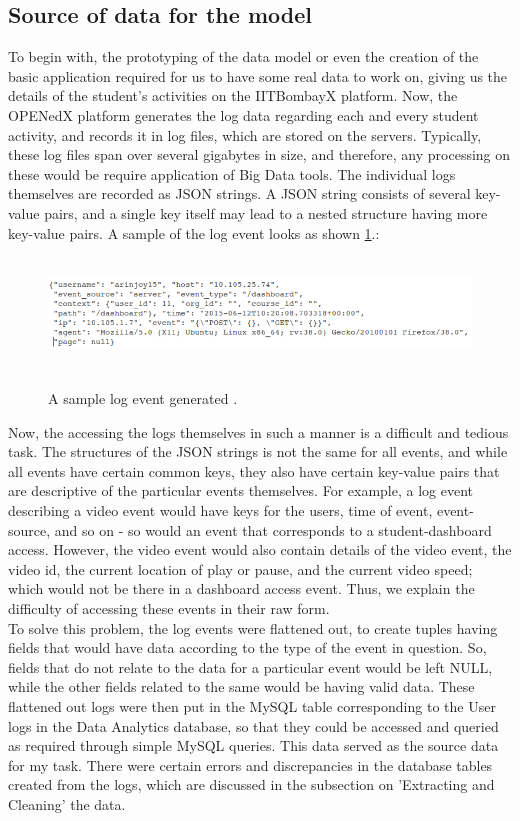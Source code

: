 \documentclass[16pt]{report}
\begin{document}
\subsection{Source of data for the model}

To begin with, the prototyping of the data model or even the creation of the basic application required for us to have some real data to work on, giving us the details of the student's activities on the IITBombayX platform. Now, the OPENedX platform generates the log data regarding each and every student activity, and records it in log files, which are stored on the servers. Typically, these log files span over several gigabytes in size, and therefore, any processing on these would be require application of Big Data tools. The individual logs themselves are recorded as JSON strings. A JSON string consists of several key-value pairs, and a single key itself may lead to a nested structure having more key-value pairs. A sample of the log event looks as shown \ref{fig:Image1}.:

\begin{figure}[H]
\centering
\includegraphics[height=3cm]{Diag1.png}\\ %
\caption{A sample log event generated \label{fig:Image1}.}
\end{figure}

Now, the accessing the logs themselves in such a manner is a difficult and tedious task. The structures of the JSON strings is not the same for all events, and while all events have certain common keys, they also have certain key-value pairs that are descriptive of the particular events themselves. For example, a log event describing a video event would have keys for the users, time of event, event-source, and so on - so would an event that corresponds to a student-dashboard access. However, the video event would also contain details of the video event, the video id, the current location of play or pause, and the current video speed; which would  not be there in a dashboard access event. Thus, we explain the difficulty of accessing these events in their raw form.\\

To solve this problem, the log events were flattened out, to create tuples having fields that would have data according to the type of the event in question. So, fields that do not relate to the data for a particular event would be left NULL, while the other fields related to the same would be having valid data. These flattened out logs were then put in the MySQL table corresponding to the User logs in the Data Analytics database, so that they could be accessed and queried as required through simple MySQL queries. This data served as the source data for my task. There were certain errors and discrepancies in the database tables created from the logs, which are discussed in the subsection on 'Extracting and Cleaning' the data.
\end{document}
